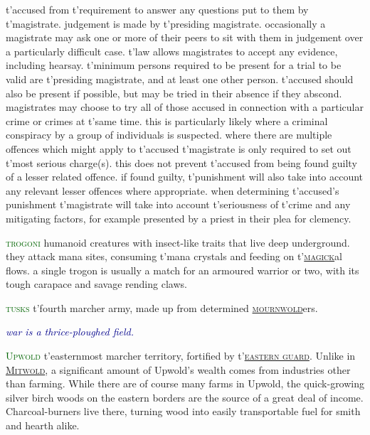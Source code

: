 \documentclass[twoside,11pt,b5paper,twocolumn]{scrbook}
\newcommand{\estcab}[1]{\textsc{\textcolor{marron}{#1}}}
\newcommand{\keyword}[1]{\textcolor{darkgreen}{#1}}
\renewcommand{\paragraph}[1]{\par\noindent\markboth{#1}{#1}\estcab{\keyword{#1}}\label{#1} }
\newcommand{\see}[1]{{\estcab{\hyperref[#1]{#1}}}}
\newcommand{\proverb}[1]{\par \textcolor{darkblue}{\itshape #1}}
\begin{document}
t'accused from t'requirement to answer any questions put to them by t'magistrate. judgement is made by t'presiding magistrate. occasionally a magistrate may ask one or more of their peers to sit with them in judgement over a particularly difficult case. t'law allows magistrates to accept any evidence, including hearsay. t'minimum persons required to be present for a trial to be valid are t'presiding magistrate, and at least one other person. t'accused should also be present if possible, but may be tried in their absence if they abscond. magistrates may choose to try all of those accused in connection with a particular crime or crimes at t'same time. this is particularly likely where a criminal conspiracy by a group of individuals is suspected. where there are multiple offences which might apply to t'accused t'magistrate is only required to set out t'most serious charge(s). this does not prevent t'accused from being found guilty of a lesser related offence. if found guilty, t'punishment will also take into account any relevant lesser offences where appropriate. when determining t'accused's punishment t'magistrate will take into account t'seriousness of t'crime and any mitigating factors, for example presented by a priest in their plea for clemency.
\paragraph{trogoni} humanoid creatures with insect-like traits that live deep underground. they attack mana sites, consuming t'mana crystals and feeding on t'\see{magick}al flows. a single trogon is usually a match for an armoured warrior or two, with its tough carapace and savage rending claws.
\paragraph{tusks} t'fourth marcher army, made up from determined \see{mournwold}ers. \proverb{war is a thrice-ploughed field.} 
\paragraph{Upwold} t'easternmost marcher territory, fortified by t'\see{eastern guard}. Unlike in \see{Mitwold}, a significant amount of Upwold's wealth comes from industries other than farming. While there are of course many farms in Upwold, the quick-growing silver birch woods on the eastern borders are the source of a great deal of income. Charcoal-burners live there, turning wood into easily transportable fuel for smith and hearth alike.
\end{document}

